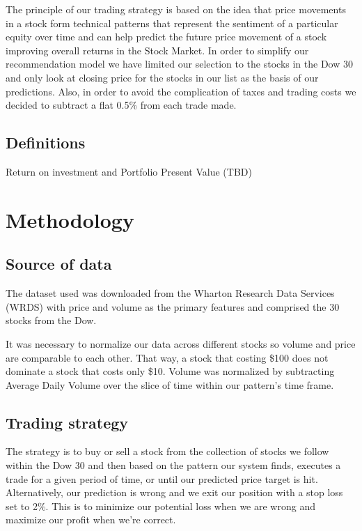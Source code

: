 \documentclass{article}
\begin{document}
The principle of our trading strategy is based on the idea that price movements in a stock form technical patterns that represent the sentiment of a particular equity over time and can help predict the future price movement of a stock improving overall returns in the Stock Market.  In order to simplify our recommendation model we have limited our selection to the stocks in the Dow 30 and only look at closing price for the stocks in our list as the basis of our predictions.  Also, in order to avoid the complication of taxes and trading costs we decided to subtract a flat 0.5\% from each trade made.


\subsection{Definitions}

Return on investment and Portfolio Present Value (TBD)

\section{Methodology}

\subsection{Source of data}

The dataset used was downloaded from the Wharton Research Data Services (WRDS) with price and volume as the primary features and comprised the 30 stocks from the Dow.

It was necessary to normalize our data across different stocks so volume and price are comparable to each other.  That way, a stock that costing \$100 does not dominate a stock that costs only \$10.  Volume was normalized by subtracting Average Daily Volume over the slice of time within our pattern's time frame. 

\subsection{Trading strategy}

The strategy is to buy or sell a stock from the collection of stocks we follow within the Dow 30 and then based on the pattern our system finds, executes a trade for a given period of time, or until our predicted price target is hit.  Alternatively, our prediction is wrong and we exit our position with a stop loss set to 2\%.  This is to minimize our potential loss when we are wrong and maximize our profit when we're correct.
\end{document}
